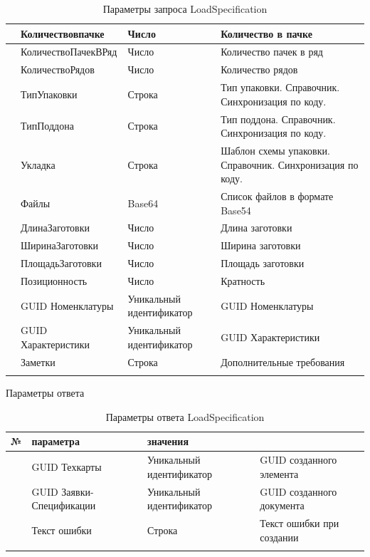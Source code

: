 \begin{longtable}{|p{10mm}|p{35mm}|p{40mm}|p{60mm}|}
\hline
\parbox[c][5mm]{9mm}{\p} &  Количествовпачке & Число &  {Количество в пачке} \\
\hline
\parbox[c][5mm]{9mm}{\p} &  КоличествоПачекВРяд & Число &  {Количество пачек в ряд} \\
\hline
\parbox[c][5mm]{9mm}{\p} &  КоличествоРядов & Число &  {Количество рядов} \\
\hline
\parbox[c][5mm]{9mm}{\p} &  ТипУпаковки & Строка &  {Тип упаковки. Справочник. Синхронизация по коду.} \\
\hline
\parbox[c][5mm]{9mm}{\p} &  ТипПоддона & Строка &  {Тип поддона. Справочник. Синхронизация по коду.} \\
\hline
\parbox[c][5mm]{9mm}{\p} &  Укладка & Строка &  {Шаблон схемы упаковки. Справочник. Синхронизация по коду.} \\
\hline
\parbox[c][5mm]{9mm}{\p} &  Файлы & \parbox{52mm}{Base64} &  {Список файлов в формате Base54} \\
\hline
\parbox[c][5mm]{9mm}{\p} &  ДлинаЗаготовки & Число &  {Длина заготовки} \\
\hline
\parbox[c][5mm]{9mm}{\p} &  ШиринаЗаготовки & Число &  {Ширина заготовки} \\
\hline
\parbox[c][5mm]{9mm}{\p} &  ПлощадьЗаготовки & Число &  {Площадь заготовки} \\
\hline
\parbox[c][5mm]{9mm}{\p} &  Позиционность & Число &  {Кратность} \\
\hline
\parbox[c][5mm]{9mm}{\p} &  GUID Номенклатуры & Уникальный идентификатор  &  {GUID Номенклатуры} \\
\hline
\parbox[c][5mm]{9mm}{\p} &  GUID Характеристики & Уникальный идентификатор &  {GUID Характеристики} \\
\hline
\parbox[c][5mm]{9mm}{\p} &  Заметки & Строка &  {Дополнительные  требования} \\
\hline
\caption{Параметры запроса LoadSpecification}\label{ex:in_LoadSpecification}
\end{longtable}  
\normalsize



Параметры ответа
\pc
\scriptsize
\begin{longtable}{|p{5mm}|p{40mm}|p{40mm}|p{60mm}|}
\hline
\parbox[c][5mm]{5mm}{\centering№} & \parbox[c]{40mm}{ параметра} & \parbox[c]{40mm}{ значения} & \parbox[c]{60mm}{} \\
\hline
\parbox[c][5mm]{15mm}{\p} & \parbox{70mm}{GUID Техкарты} & \parbox{54mm}{Уникальный идентификатор} & \parbox{49mm}{GUID созданного элемента} \\
\hline
\parbox[c][5mm]{15mm}{\p} & \parbox{70mm}{GUID Заявки-Спецификации} & \parbox{54mm}{Уникальный идентификатор} & \parbox{49mm}{GUID созданного документа} \\
\hline
\parbox[c][5mm]{15mm}{\p} & \parbox{70mm}{Текст ошибки} & \parbox{54mm}{Строка} & \parbox{49mm}{Текст ошибки при создании} \\
\hline
\caption{Параметры ответа LoadSpecification}\label{ex:outLout_Specification}
\end{longtable}  
\normalsize




